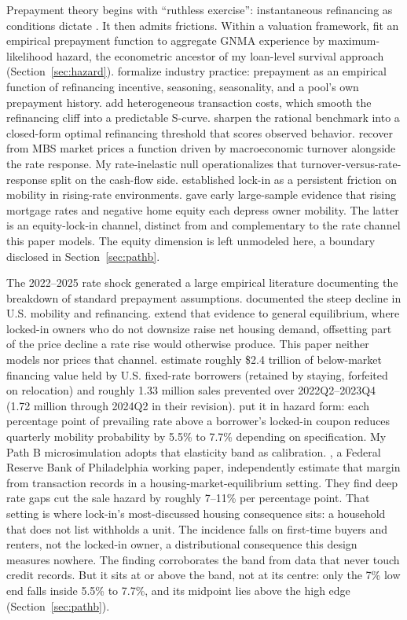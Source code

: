 \documentclass[12pt]{article}
\begin{document}
Prepayment theory begins with ``ruthless exercise'': instantaneous refinancing as conditions dictate \citep{dunn1981}. It then admits frictions. Within a valuation framework, \citet{schwartz1989} fit an empirical prepayment function to aggregate GNMA experience by maximum-likelihood hazard, the econometric ancestor of my loan-level survival approach (Section~\ref{sec:hazard}). \citet{richard1989} formalize industry practice: prepayment as an empirical function of refinancing incentive, seasoning, seasonality, and a pool's own prepayment history. \citet{stanton1995} add heterogeneous transaction costs, which smooth the refinancing cliff into a predictable S-curve. \citet{agarwal2013} sharpen the rational benchmark into a closed-form optimal refinancing threshold that scores observed behavior. \citet{chernov2018} recover from MBS market prices a function driven by macroeconomic turnover alongside the rate response. My rate-inelastic null operationalizes that turnover-versus-rate-response split on the cash-flow side. \citet{quigley1987,quigley2002} established lock-in as a persistent friction on mobility in rising-rate environments. \citet{ferreira2010} gave early large-sample evidence that rising mortgage rates and negative home equity each depress owner mobility. The latter is an equity-lock-in channel, distinct from and complementary to the rate channel this paper models. The equity dimension is left unmodeled here, a boundary disclosed in Section~\ref{sec:pathb}.

The 2022--2025 rate shock generated a large empirical literature documenting the breakdown of standard prepayment assumptions. \citet{fonseca2024} documented the steep decline in U.S. mobility and refinancing. \citet{fonseca2026} extend that evidence to general equilibrium, where locked-in owners who do not downsize raise net housing demand, offsetting part of the price decline a rate rise would otherwise produce. This paper neither models nor prices that channel. \citet{batzer2024} estimate roughly \$2.4 trillion of below-market financing value held by U.S. fixed-rate borrowers (retained by staying, forfeited on relocation) and roughly 1.33 million sales prevented over 2022Q2--2023Q4 (1.72 million through 2024Q2 in their revision). \citet{liebersohn2024} put it in hazard form: each percentage point of prevailing rate above a borrower's locked-in coupon reduces quarterly mobility probability by 5.5\% to 7.7\% depending on specification. My Path B microsimulation adopts that elasticity band as calibration. \citet{graybill2026}, a Federal Reserve Bank of Philadelphia working paper, independently estimate that margin from transaction records in a housing-market-equilibrium setting. They find deep rate gaps cut the sale hazard by roughly 7--11\% per percentage point. That setting is where lock-in's most-discussed housing consequence sits: a household that does not list withholds a unit. The incidence falls on first-time buyers and renters, not the locked-in owner, a distributional consequence this design measures nowhere. The finding corroborates the band from data that never touch credit records. But it sits at or above the band, not at its centre: only the 7\% low end falls inside 5.5\% to 7.7\%, and its midpoint lies above the high edge (Section~\ref{sec:pathb}).
\end{document}
